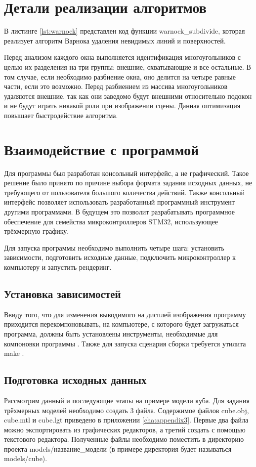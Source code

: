 \section{Детали реализации алгоритмов}
В листинге \ref{lst:warnock} представлен код функции warnock\_subdivide, которая реализует алгоритм Варнока удаления 
невидимых линий и поверхностей.


Перед анализом каждого окна выполняется идентификация многоугольников с целью их разделения на три группы: внешние, 
охватывающие и все остальные. В том случае, если необходимо разбиение окна, оно делится на четыре равные части, если это возможно. 
Перед разбиением из массива многоугольников удаляются внешние, так как они заведомо будут внешними относительно подокон и 
не будут играть никакой роли при изображении сцены. Данная оптимизация повышает быстродействие алгоритма.

\section{Взаимодействие с программой}
Для программы был разработан консольный интерфейс, а не графический. Такое решение было принято по причине выбора формата задания 
исходных данных, не требующего от пользователя большого количества действий. Также консольный интерфейс позволяет использовать 
разработанный программный инструмент другими программами. В будущем это позволит разрабатывать программное обеспечение для семейства 
микроконтроллеров STM32, использующее трёхмерную графику.

Для запуска программы необходимо выполнить четыре шага: установить зависимости, подготовить исходные данные, подключить 
микроконтроллер к компьютеру и запустить рендеринг.

\subsection{Установка зависимостей}
Ввиду того, что для изменения выводимого на дисплей изображения программу приходится перекомпоновывать, на компьютере, с которого 
будет загружаться программа, должны быть установлены инструменты, необходимые для компоновки программы \cite{toolchain}. 
Также для запуска сценария сборки требуется утилита make \cite{make}.

\subsection{Подготовка исходных данных}
Рассмотрим данный и последующие этапы на примере модели куба. Для задания трёхмерных моделей необходимо создать 3 файла. 
Содержимое файлов cube.obj, cube.mtl и cube.lgt приведено в приложении \ref{cha:appendix3}. Первые два файла можно экспортировать 
из графических редакторов, а третий создать с помощью текстового редактора. Полученные файлы необходимо поместить в директорию 
проекта models/название\_модели (в примере директория будет называться models/cube).

